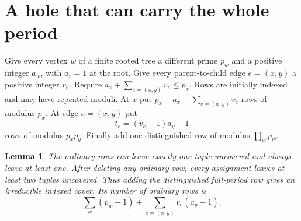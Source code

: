 \documentclass[11pt]{article}
\newtheorem{lemma}[theorem]{Lemma}
\begin{document}
\section{A hole that can carry the whole period}
Give every vertex $w$ of a finite rooted tree a different prime $p_w$ and a positive integer $a_w$, with $a_r=1$ at the root. Give every parent-to-child edge $e=(x,y)$ a positive integer $v_e$. Require $a_x+\sum_{e=(x,y)}v_e\le p_x$. Rows are initially indexed and may have repeated moduli. At $x$ put $p_x-a_x-\sum_{e=(x,y)}v_e$ rows of modulus $p_x$. At edge $e=(x,y)$ put
\[
                   t_e=(v_e+1)a_y-1
\]
rows of modulus $p_xp_y$. Finally add one distinguished row of modulus $\prod_w p_w$.
\begin{lemma}\label{tree}
The ordinary rows can leave exactly one tuple uncovered and always leave at least one. After deleting any ordinary row, every assignment leaves at least two tuples uncovered. Thus adding the distinguished full-period row gives an irreducible indexed cover. Its number of ordinary rows is
\[
          \sum_w(p_w-1)+\sum_{e=(x,y)}v_e(a_y-1).
\]
\end{lemma}
\end{document}
